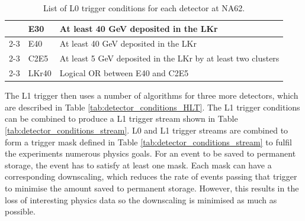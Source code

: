 \documentclass[../../main.tex]{subfiles}
\begin{document}
\begin{table}[t]
{\begin{tabular}{|l|l|p{10cm}|}
                                & E30                & At least 40 GeV deposited in the LKr \\ \cline{2-3}
                                & E40                & At least 40 GeV deposited in the LKr \\ \cline{2-3}
                                & C2E5               & At least 5 GeV deposited in the LKr by at least two clusters \\ \cline{2-3}
                                & LKr40              & Logical OR between E40 and C2E5 \\ \hline
        \end{tabular}
        }
        \caption{List of L0 trigger conditions for each detector at NA62.}
        \label{tab:detector_conditions}
    \end{table}
    The L1 trigger then uses a number of algorithms for three more detectors, which are described in Table \ref{tab:detector_conditions_HLT}. The L1 trigger conditions can be combined to produce a L1 trigger stream shown in Table \ref{tab:detector_conditions_stream}. L0 and L1 trigger streams are combined to form a trigger mask defined in Table \ref{tab:detector_conditions_stream} to fulfil the experiments numerous physics goals. For an event to be saved to permanent storage, the event has to satisfy at least one mask.
    Each mask can have a corresponding downscaling, which reduces the rate of events passing that trigger to minimise the amount saved to permanent storage. However, this results in the loss of interesting physics data so the downscaling is minimised as much as possible.
\end{document}
